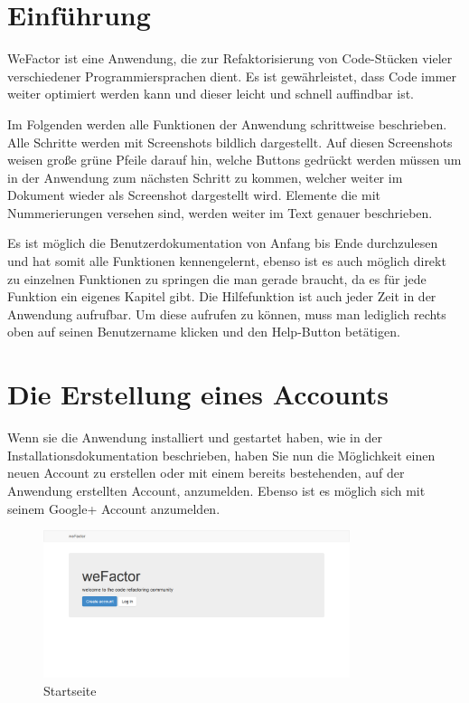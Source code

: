
\thispagestyle{plain}

\chapter{Einführung}
WeFactor ist eine Anwendung, die zur Refaktorisierung von Code-Stücken vieler verschiedener Programmiersprachen dient. Es ist gewährleistet, dass Code immer weiter optimiert werden kann und dieser leicht und schnell auffindbar ist. 

Im Folgenden werden alle Funktionen der Anwendung schrittweise beschrieben. Alle Schritte werden mit Screenshots bildlich dargestellt. Auf diesen Screenshots weisen große grüne Pfeile darauf hin, welche Buttons gedrückt werden müssen um in der Anwendung zum nächsten Schritt zu kommen, welcher weiter im Dokument wieder als Screenshot dargestellt wird. Elemente die mit Nummerierungen versehen sind, werden weiter im Text genauer beschrieben.

Es ist möglich die Benutzerdokumentation von Anfang bis Ende durchzulesen und hat somit alle Funktionen kennengelernt, ebenso ist es auch möglich direkt zu einzelnen Funktionen zu springen die man gerade braucht, da es für jede Funktion ein eigenes Kapitel gibt.
Die Hilfefunktion ist auch jeder Zeit in der Anwendung aufrufbar. Um diese aufrufen zu können, muss man lediglich rechts oben auf seinen Benutzername klicken und den \glqq Help\grqq -Button betätigen. 



\chapter{Die Erstellung eines Accounts}
Wenn sie die Anwendung installiert und gestartet haben, wie in der Installationsdokumentation beschrieben, haben Sie nun die Möglichkeit einen neuen Account zu erstellen oder mit einem bereits bestehenden, auf der Anwendung erstellten Account, anzumelden. Ebenso ist es möglich sich mit seinem Google+ Account anzumelden.

\begin{figure}[H]
    \centering
    \includegraphics[width=0.8\textwidth]{Bilder/1.png}
    \caption{Startseite}
    \label{fig:startseite}
\end{figure}


